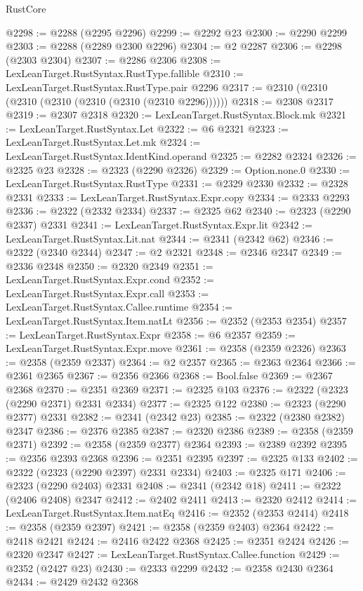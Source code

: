 \begin{lexlean}{RustCore}
\begin{coremodule}
@2298 := @2288 (@2295 @2296)
@2299 := @2292 @23
@2300 := @2290 @2299
@2303 := @2288 (@2289 @2300 @2296)
@2304 := @2 @2287
@2306 := @2298 (@2303 @2304)
@2307 := @2286 @2306
@2308 := LexLeanTarget.RustSyntax.RustType.fallible
@2310 := LexLeanTarget.RustSyntax.RustType.pair @2296
@2317 := @2310 (@2310 (@2310 (@2310 (@2310 (@2310 (@2310 @2296))))))
@2318 := @2308 @2317
@2319 := @2307 @2318
@2320 := LexLeanTarget.RustSyntax.Block.mk
@2321 := LexLeanTarget.RustSyntax.Let
@2322 := @6 @2321
@2323 := LexLeanTarget.RustSyntax.Let.mk
@2324 := LexLeanTarget.RustSyntax.IdentKind.operand
@2325 := @2282 @2324
@2326 := @2325 @23
@2328 := @2323 (@2290 @2326)
@2329 := Option.none.{0}
@2330 := LexLeanTarget.RustSyntax.RustType
@2331 := @2329 @2330
@2332 := @2328 @2331
@2333 := LexLeanTarget.RustSyntax.Expr.copy
@2334 := @2333 @2293
@2336 := @2322 (@2332 @2334)
@2337 := @2325 @62
@2340 := @2323 (@2290 @2337) @2331
@2341 := LexLeanTarget.RustSyntax.Expr.lit
@2342 := LexLeanTarget.RustSyntax.Lit.nat
@2344 := @2341 (@2342 @62)
@2346 := @2322 (@2340 @2344)
@2347 := @2 @2321
@2348 := @2346 @2347
@2349 := @2336 @2348
@2350 := @2320 @2349
@2351 := LexLeanTarget.RustSyntax.Expr.cond
@2352 := LexLeanTarget.RustSyntax.Expr.call
@2353 := LexLeanTarget.RustSyntax.Callee.runtime
@2354 := LexLeanTarget.RustSyntax.Item.natLt
@2356 := @2352 (@2353 @2354)
@2357 := LexLeanTarget.RustSyntax.Expr
@2358 := @6 @2357
@2359 := LexLeanTarget.RustSyntax.Expr.move
@2361 := @2358 (@2359 @2326)
@2363 := @2358 (@2359 @2337)
@2364 := @2 @2357
@2365 := @2363 @2364
@2366 := @2361 @2365
@2367 := @2356 @2366
@2368 := Bool.false
@2369 := @2367 @2368
@2370 := @2351 @2369
@2371 := @2325 @103
@2376 := @2322 (@2323 (@2290 @2371) @2331 @2334)
@2377 := @2325 @122
@2380 := @2323 (@2290 @2377) @2331
@2382 := @2341 (@2342 @23)
@2385 := @2322 (@2380 @2382) @2347
@2386 := @2376 @2385
@2387 := @2320 @2386
@2389 := @2358 (@2359 @2371)
@2392 := @2358 (@2359 @2377) @2364
@2393 := @2389 @2392
@2395 := @2356 @2393 @2368
@2396 := @2351 @2395
@2397 := @2325 @133
@2402 := @2322 (@2323 (@2290 @2397) @2331 @2334)
@2403 := @2325 @171
@2406 := @2323 (@2290 @2403) @2331
@2408 := @2341 (@2342 @18)
@2411 := @2322 (@2406 @2408) @2347
@2412 := @2402 @2411
@2413 := @2320 @2412
@2414 := LexLeanTarget.RustSyntax.Item.natEq
@2416 := @2352 (@2353 @2414)
@2418 := @2358 (@2359 @2397)
@2421 := @2358 (@2359 @2403) @2364
@2422 := @2418 @2421
@2424 := @2416 @2422 @2368
@2425 := @2351 @2424
@2426 := @2320 @2347
@2427 := LexLeanTarget.RustSyntax.Callee.function
@2429 := @2352 (@2427 @23)
@2430 := @2333 @2299
@2432 := @2358 @2430 @2364
@2434 := @2429 @2432 @2368

\end{coremodule}
\end{lexlean}
